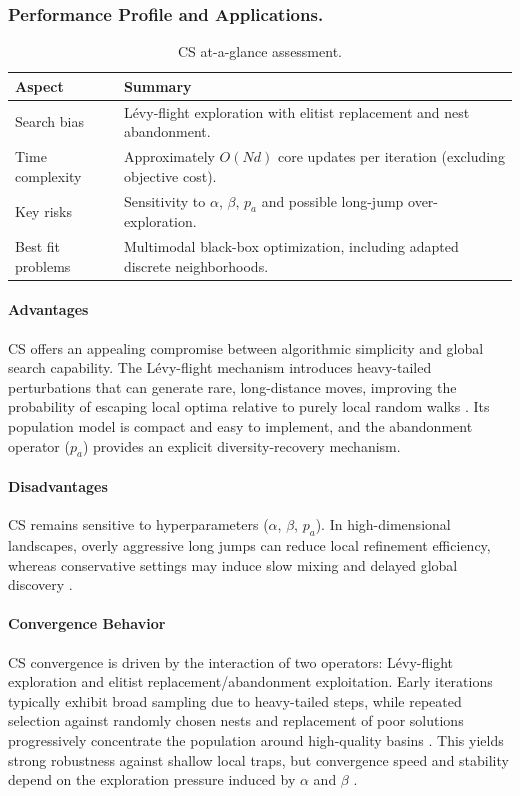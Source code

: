 \subsubsection{Performance Profile and Applications.}

\begin{table}[H]
\centering
\caption{CS at-a-glance assessment.}
\label{tab:cs-profile}
\begin{tabular}{p{3.2cm} p{9.3cm}}
\hline
\textbf{Aspect} & \textbf{Summary} \\
\hline
Search bias & Lévy-flight exploration with elitist replacement and nest abandonment. \\
Time complexity & Approximately $O(Nd)$ core updates per iteration (excluding objective cost). \\
Key risks & Sensitivity to $\alpha$, $\beta$, $p_a$ and possible long-jump over-exploration. \\
Best fit problems & Multimodal black-box optimization, including adapted discrete neighborhoods. \\
\hline
\end{tabular}
\end{table}

\paragraph{Advantages}
CS offers an appealing compromise between algorithmic simplicity and global search capability. The Lévy-flight mechanism introduces heavy-tailed perturbations that can generate rare, long-distance moves, improving the probability of escaping local optima relative to purely local random walks \autocite{YangDeb2009,YangDeb2014Cuckoo}. Its population model is compact and easy to implement, and the abandonment operator ($p_a$) provides an explicit diversity-recovery mechanism.

\paragraph{Disadvantages}
CS remains sensitive to hyperparameters ($\alpha$, $\beta$, $p_a$). In high-dimensional landscapes, overly aggressive long jumps can reduce local refinement efficiency, whereas conservative settings may induce slow mixing and delayed global discovery \autocite{YangDeb2014Cuckoo}.

\paragraph{Convergence Behavior}
CS convergence is driven by the interaction of two operators: Lévy-flight exploration and elitist replacement/abandonment exploitation. Early iterations typically exhibit broad sampling due to heavy-tailed steps, while repeated selection against randomly chosen nests and replacement of poor solutions progressively concentrate the population around high-quality basins \autocite{YangDeb2009}. This yields strong robustness against shallow local traps, but convergence speed and stability depend on the exploration pressure induced by $\alpha$ and $\beta$ \autocite{YangDeb2014Cuckoo}.


